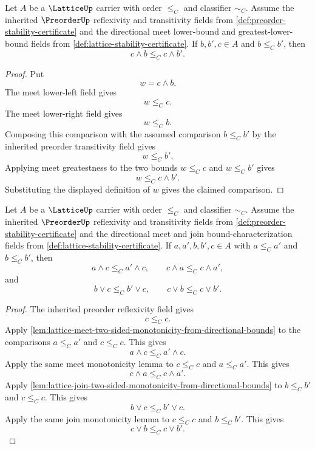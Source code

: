 \begin{lemma}
\label{lem:lattice-meet-monotonicity-second-argument-from-directional-bounds}
Let $A$ be a $\LatticeUp$ carrier with order $\le_C$ and classifier $\sim_C$. Assume the inherited $\PreorderUp$ reflexivity and transitivity fields from \autoref{def:preorder-stability-certificate} and the directional meet lower-bound and greatest-lower-bound fields from \autoref{def:lattice-stability-certificate}. If $b,b',c\in A$ and $b\le_C b'$, then
$$
c\wedge b\le_C c\wedge b'.
$$
\end{lemma}
\begin{proof}
Put
$$
w=c\wedge b.
$$
The meet lower-left field gives
$$
w\le_C c.
$$
The meet lower-right field gives
$$
w\le_C b.
$$
Composing this comparison with the assumed comparison $b\le_C b'$ by the inherited preorder transitivity field gives
$$
w\le_C b'.
$$
Applying meet greatestness to the two bounds $w\le_C c$ and $w\le_C b'$ gives
$$
w\le_C c\wedge b'.
$$
Substituting the displayed definition of $w$ gives the claimed comparison.
\end{proof}

\begin{theorem}
\label{thm:lattice-operation-monotonicity-from-directional-bounds}
Let $A$ be a $\LatticeUp$ carrier with order $\le_C$ and classifier $\sim_C$. Assume the inherited $\PreorderUp$ reflexivity and transitivity fields from \autoref{def:preorder-stability-certificate} and the directional meet and join bound-characterization fields from \autoref{def:lattice-stability-certificate}. If $a,a',b,b',c\in A$ with $a\le_C a'$ and $b\le_C b'$, then
$$
a\wedge c\le_C a'\wedge c,
\qquad
c\wedge a\le_C c\wedge a',
$$
and
$$
b\vee c\le_C b'\vee c,
\qquad
c\vee b\le_C c\vee b'.
$$
\end{theorem}
\begin{proof}
The inherited preorder reflexivity field gives
$$
c\le_C c.
$$
Apply \autoref{lem:lattice-meet-two-sided-monotonicity-from-directional-bounds} to the comparisons $a\le_C a'$ and $c\le_C c$. This gives
$$
a\wedge c\le_C a'\wedge c.
$$
Apply the same meet monotonicity lemma to $c\le_C c$ and $a\le_C a'$. This gives
$$
c\wedge a\le_C c\wedge a'.
$$
Apply \autoref{lem:lattice-join-two-sided-monotonicity-from-directional-bounds} to $b\le_C b'$ and $c\le_C c$. This gives
$$
b\vee c\le_C b'\vee c.
$$
Apply the same join monotonicity lemma to $c\le_C c$ and $b\le_C b'$. This gives
$$
c\vee b\le_C c\vee b'.
$$
\end{proof}
